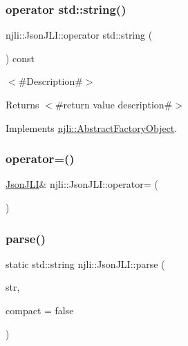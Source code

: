 \subsubsection{\texorpdfstring{operator std\+::string()}{operator std::string()}}
{\footnotesize\ttfamily njli\+::\+Json\+J\+L\+I\+::operator std\+::string (\begin{DoxyParamCaption}{ }\end{DoxyParamCaption}) const\hspace{0.3cm}{\ttfamily [virtual]}}

$<$\#\+Description\#$>$

\begin{DoxyReturn}{Returns}
$<$\#return value description\#$>$ 
\end{DoxyReturn}


Implements \mbox{\hyperlink{classnjli_1_1_abstract_factory_object_a838f4fa7e65cace6098aab5222892942}{njli\+::\+Abstract\+Factory\+Object}}.

\mbox{\label{classnjli_1_1_json_j_l_i_a7c5ca5292cb72b9fae301d2c7acde205}} 
\subsubsection{\texorpdfstring{operator=()}{operator=()}}
{\footnotesize\ttfamily \mbox{\hyperlink{classnjli_1_1_json_j_l_i}{Json\+J\+LI}}\& njli\+::\+Json\+J\+L\+I\+::operator= (\begin{DoxyParamCaption}\item[{const \mbox{\hyperlink{classnjli_1_1_json_j_l_i}{Json\+J\+LI}} \&}]{ }\end{DoxyParamCaption})\hspace{0.3cm}{\ttfamily [protected]}}

\mbox{\label{classnjli_1_1_json_j_l_i_acad2f27febb63dd99601b1835958b839}} 
\subsubsection{\texorpdfstring{parse()}{parse()}}
{\footnotesize\ttfamily static std\+::string njli\+::\+Json\+J\+L\+I\+::parse (\begin{DoxyParamCaption}\item[{const char $\ast$}]{str,  }\item[{bool}]{compact = {\ttfamily false} }\end{DoxyParamCaption})\hspace{0.3cm}{\ttfamily [static]}}

